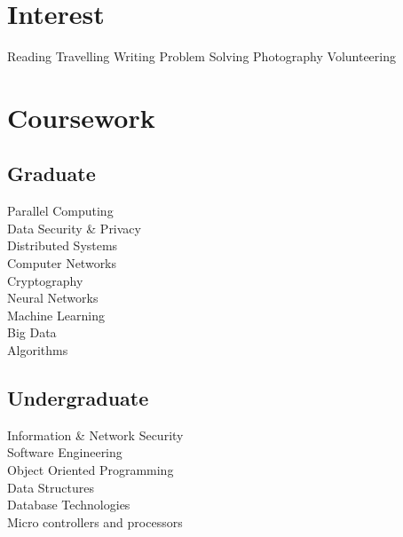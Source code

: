 \documentclass[]{main}
\begin{document}
\newpage

\begin{minipage}[t]{0.25\textwidth} 


\section{Interest}
                    Reading 
    \textbullet{}   Travelling
    \textbullet{}   Writing 
    \textbullet{}   Problem Solving
    \textbullet{}   Photography
    \textbullet{}   Volunteering
\sectionsep


\section{Coursework}

\subsection{Graduate}
\sectionsep
Parallel Computing\\
Data Security \& Privacy\\
Distributed Systems\\
Computer Networks\\
Cryptography\\
Neural Networks\\
Machine Learning\\
Big Data\\
Algorithms\\
\sectionsep

\subsection{Undergraduate}
\sectionsep
Information \& Network Security\\
Software Engineering\\
Object Oriented Programming\\
Data Structures\\
Database Technologies\\
Micro controllers and processors\\
\sectionsep



\end{minipage} 
\end{document}
